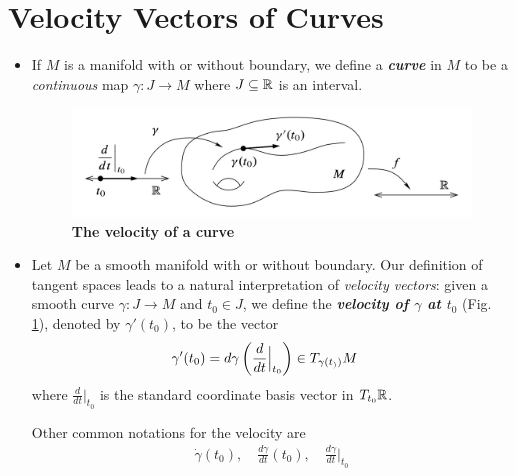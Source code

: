 \documentclass[11pt]{article}
\begin{document}
\section{Velocity Vectors of Curves}
\begin{itemize}
\item \begin{definition}
If $M$ is a manifold with or without boundary, we define a \textbf{\emph{curve}} in $M$ to be a \emph{continuous} map $\gamma: J \rightarrow M$ where $J \subseteq {\mathbb R}$ is an interval. 
\end{definition}

\begin{figure}
\begin{minipage}[t]{1\linewidth}
  \centering
  \centerline{\includegraphics[scale = 0.5]{velocity_of_curve.png}}
\end{minipage}
\caption{\footnotesize{\textbf{The velocity of a curve \citep{lee2003introduction}}}}
\label{fig: velocity_of_curve}
\end{figure}

\item \begin{definition}
Let $M$ be a smooth manifold with or without boundary. Our definition of tangent spaces leads to a natural interpretation of \emph{velocity vectors}: given a smooth curve $\gamma: J \rightarrow M$ and $t_{0} \in J$, we define the \textbf{\emph{velocity of $\gamma$ at $t_0$}} (Fig. \ref{fig: velocity_of_curve}), denoted by $\gamma'(t_0)$, to be the vector
\begin{align*}
\gamma'(t_0) &= d\gamma\left(\frac{d}{dt}\Bigr|_{t_0}\right) \in T_{\gamma(t_))}M
\end{align*} where $\frac{d}{dt}\big|_{t_0}$ is the standard coordinate basis vector in $T_{t_0}{\mathbb R}$. 
\end{definition}

Other common notations for the velocity are
\begin{align*}
\dot{\gamma}(t_0), \quad \frac{d\gamma}{dt}(t_0), \quad \frac{d\gamma}{dt}\Bigr|_{t_0}
\end{align*}


\end{itemize}
\end{document}
